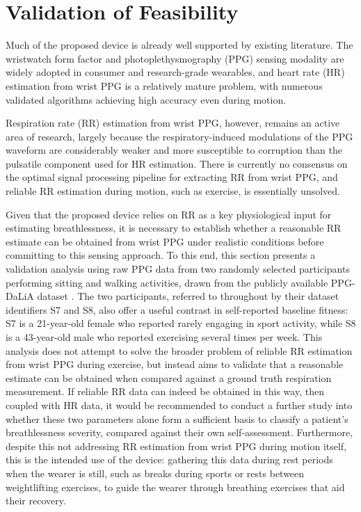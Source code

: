 \section{Validation of Feasibility}

Much of the proposed device is already well supported by existing literature. The wristwatch form factor and photoplethysmography (PPG) sensing modality are widely adopted in consumer and research-grade wearables, and heart rate (HR) estimation from wrist PPG is a relatively mature problem, with numerous validated algorithms achieving high accuracy even during motion.

Respiration rate (RR) estimation from wrist PPG, however, remains an active area of research, largely because the respiratory-induced modulations of the PPG waveform are considerably weaker and more susceptible to corruption than the pulsatile component used for HR estimation. There is currently no consensus on the optimal signal processing pipeline for extracting RR from wrist PPG, and reliable RR estimation during motion, such as exercise, is essentially unsolved.

Given that the proposed device relies on RR as a key physiological input for estimating breathlessness, it is necessary to establish whether a reasonable RR estimate can be obtained from wrist PPG under realistic conditions before committing to this sensing approach. To this end, this section presents a validation analysis using raw PPG data from two randomly selected participants performing sitting and walking activities, drawn from the publicly available PPG-DaLiA dataset \cite{reissPPGDaLiA2019}. The two participants, referred to throughout by their dataset identifiers S7 and S8, also offer a useful contrast in self-reported baseline fitness: S7 is a 21-year-old female who reported rarely engaging in sport activity, while S8 is a 43-year-old male who reported exercising several times per week. This analysis does not attempt to solve the broader problem of reliable RR estimation from wrist PPG during exercise, but instead aims to validate that a reasonable estimate can be obtained when compared against a ground truth respiration measurement. If reliable RR data can indeed be obtained in this way, then coupled with HR data, it would be recommended to conduct a further study into whether these two parameters alone form a sufficient basis to classify a patient's breathlessness severity, compared against their own self-assessment. Furthermore, despite this not addressing RR estimation from wrist PPG during motion itself, this is the intended use of the device: gathering this data during rest periods when the wearer is still, such as breaks during sports or rests between weightlifting exercises, to guide the wearer through breathing exercises that aid their recovery.

